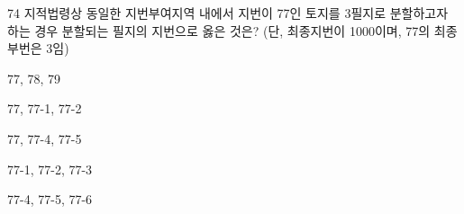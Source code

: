 \begin{question}{74}
지적법령상 동일한 지번부여지역 내에서 지번이 77인 토지를 3필지로 분할하고자 하는 경우 분할되는 필지의 지번으로 옳은 것은? (단, 최종지번이 1000이며, 77의 최종 부번은 3임)
\begin{choices}
  \item 77, 78, 79
  \item 77, 77-1, 77-2
  \item 77, 77-4, 77-5
  \item 77-1, 77-2, 77-3
  \item 77-4, 77-5, 77-6
\end{choices}
\end{question}
